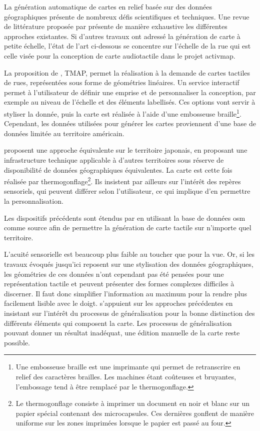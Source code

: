 \newpar{}

La génération automatique de cartes en relief basée sur des données géographiques présente de nombreux défis scientifiques et techniques. Une revue de littérature proposée par \citet{Wabinski2019} présente de manière exhaustive les différentes approches existantes. Si d'autres travaux ont adressé la génération de carte à petite échelle, l'état de l'art ci-dessous se concentre sur l'échelle de la rue qui est celle visée pour la conception de carte audiotactile dans le projet \gls{activmap}.

\newpar{}

La proposition de \citet{Miele2004}, TMAP, permet la réalisation à la demande de cartes tactiles de rues, représentées sous forme de géométries linéaires. Un service interactif permet à l'utilisateur de définir une emprise et de personnaliser la conception, par exemple au niveau de l'échelle et des éléments labellisés. Ces options vont servir à styliser la donnée, puis la carte est réalisée à l'aide d'une embosseuse braille\footnote{Une embosseuse braille est une imprimante qui permet de retranscrire en relief des caractères brailles. Les machines étant coûteuses et bruyantes, l'embossage tend à être remplacé par le thermogonflage.}. Cependant, les données utilisées pour générer les cartes proviennent d'une base de données limitée au territoire américain. 

\newpar{}

\citet{Minatani2010} proposent une approche équivalente sur le territoire japonais, en proposant une infrastructure technique applicable à d'autres territoires sous réserve de disponibilité de données géographiques équivalentes. La carte est cette fois réalisée par thermogonflage\footnote{Le thermogonflage consiste à imprimer un document en noir et blanc sur un papier spécial contenant des microcapsules. Ces dernières gonflent de manière uniforme sur les zones imprimées lorsque le papier est passé au four.}. Ils insistent par ailleurs sur l'intérêt des repères sensoriels, qui peuvent différer selon l'utilisateur, ce qui implique d'en permettre la personnalisation. 

\newpar{}

Les dispositifs précédents sont étendus par \citet{Watanabe2014, Cervenka2016} en utilisant la base de données \gls{osm} comme source afin de permettre la génération de carte tactile sur n'importe quel territoire.

\newpar{}

L'acuité sensorielle est beaucoup plus faible au toucher que pour la vue. Or, si les travaux évoqués jusqu'ici reposent sur une stylisation des données géographiques, les géométries de ces données n'ont cependant pas été pensées pour une représentation tactile et peuvent présenter des formes complexes difficiles à discerner. Il faut donc simplifier l'information  au maximum pour la rendre plus facilement lisible avec le doigt. \citet{Stampach2016} s'appuient sur les approches précédentes en insistant sur l’intérêt du processus de généralisation pour la bonne distinction des différents éléments qui composent la carte. Les processus de généralisation pouvant donner un résultat inadéquat, une édition manuelle de la carte reste possible.


